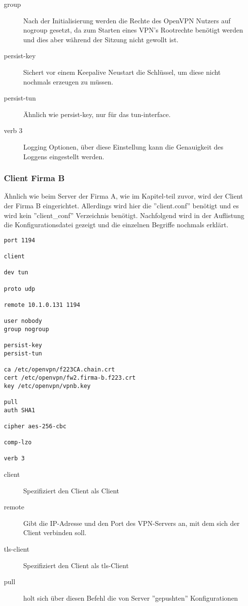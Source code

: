 \begin{description}
	\item[group]Nach der Initialisierung werden die Rechte des OpenVPN Nutzers auf nogroup gesetzt, da zum Starten eines VPN's Rootrechte benötigt werden und dies aber während der Sitzung nicht gewollt ist.
	\item[persist-key] Sichert vor einem Keepalive Neustart die Schlüssel, um diese nicht nochmals erzeugen zu müssen.
	\item[persist-tun] Ähnlich wie persist-key, nur für das tun-interface.  
	\item[verb 3] Logging Optionen, über diese Einstellung kann die Genauigkeit des Loggens eingestellt werden.
\end{description}

\subsubsection{Client Firma B}
Ähnlich wie beim Server der Firma A, wie im Kapitel-teil zuvor, wird der Client der Firma B eingerichtet. Allerdings wird hier die ''client.conf'' benötigt und es wird kein ''client\_conf'' Verzeichnis benötigt. Nachfolgend wird in der Auflistung  die Konfigurationsdatei gezeigt und die einzelnen Begriffe nochmals erklärt.\newline
\lstset{
	basicstyle=\footnotesize, frame=tb,
	xleftmargin=.2\textwidth, xrightmargin=.2\textwidth
}
\begin{lstlisting}[caption={client.conf Datei der Firma B},label=lst:clientconf]
port 1194

client

dev tun

proto udp

remote 10.1.0.131 1194

user nobody
group nogroup

persist-key
persist-tun

ca /etc/openvpn/f223CA.chain.crt
cert /etc/openvpn/fw2.firma-b.f223.crt
key /etc/openvpn/vpnb.key

pull
auth SHA1

cipher aes-256-cbc

comp-lzo

verb 3
\end{lstlisting}
\vspace{\baselineskip}
\begin{description}
	\item[client] Spezifiziert den Client als Client
	\item[remote] Gibt die IP-Adresse und den Port des VPN-Servers an, mit dem sich der Client verbinden soll.
	\item[tls-client] Spezifiziert den Client als tls-Client
	\item[pull] holt sich über diesen Befehl die von Server ''gepushten'' Konfigurationen
\end{description}









